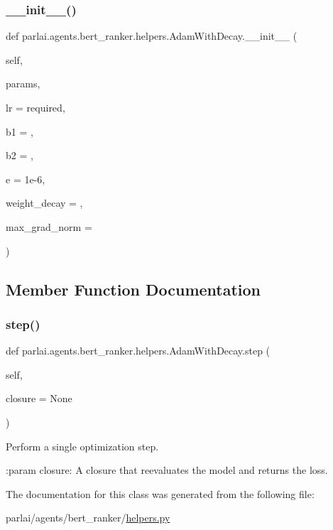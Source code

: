 \subsubsection{\texorpdfstring{\+\_\+\+\_\+init\+\_\+\+\_\+()}{\_\_init\_\_()}}
{\footnotesize\ttfamily def parlai.\+agents.\+bert\+\_\+ranker.\+helpers.\+Adam\+With\+Decay.\+\_\+\+\_\+init\+\_\+\+\_\+ (\begin{DoxyParamCaption}\item[{}]{self,  }\item[{}]{params,  }\item[{}]{lr = {\ttfamily required},  }\item[{}]{b1 = {},  }\item[{}]{b2 = {},  }\item[{}]{e = {\ttfamily 1e-\/6},  }\item[{}]{weight\+\_\+decay = {},  }\item[{}]{max\+\_\+grad\+\_\+norm = {} }\end{DoxyParamCaption})}



\subsection{Member Function Documentation}
\mbox{\label{classparlai_1_1agents_1_1bert__ranker_1_1helpers_1_1AdamWithDecay_aeb41188377c1a61b4638228abd6c3e64}} 
\subsubsection{\texorpdfstring{step()}{step()}}
{\footnotesize\ttfamily def parlai.\+agents.\+bert\+\_\+ranker.\+helpers.\+Adam\+With\+Decay.\+step (\begin{DoxyParamCaption}\item[{}]{self,  }\item[{}]{closure = {\ttfamily None} }\end{DoxyParamCaption})}

\begin{DoxyVerb}Perform a single optimization step.

:param closure:
    A closure that reevaluates the model and returns the loss.
\end{DoxyVerb}
 

The documentation for this class was generated from the following file\+:\begin{DoxyCompactItemize}
\item 
parlai/agents/bert\+\_\+ranker/\hyperlink{helpers_8py}{helpers.\+py}\end{DoxyCompactItemize}
